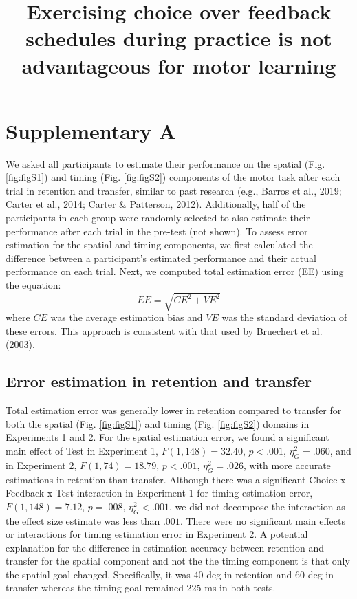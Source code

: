\documentclass[
  doc, donotrepeattitle,floatsintext]{apa7}
\title{Exercising choice over feedback schedules during practice is not advantageous for motor learning}
\author{\phantom{0}}
\date{}
\affiliation{\phantom{0}}
\begin{document}
\maketitle

\hypertarget{supplementary-a}{%
\section{Supplementary A}\label{supplementary-a}}

We asked all participants to estimate their performance on the spatial (Fig. \ref{fig:figS1}) and timing (Fig. \ref{fig:figS2}) components of the motor task after each trial in retention and transfer, similar to past research (e.g., Barros et al., 2019; Carter et al., 2014; Carter \& Patterson, 2012). Additionally, half of the participants in each group were randomly selected to also estimate their performance after each trial in the pre-test (not shown). To assess error estimation for the spatial and timing components, we first calculated the difference between a participant's estimated performance and their actual performance on each trial. Next, we computed total estimation error (EE) using the equation:
\begin{equation}
EE = \sqrt{CE^2 + VE^2}
\end{equation}
where \(CE\) was the average estimation bias and \(VE\) was the standard deviation of these errors. This approach is consistent with that used by Bruechert et al. (2003).

\hypertarget{error-estimation-in-retention-and-transfer}{%
\subsection{Error estimation in retention and transfer}\label{error-estimation-in-retention-and-transfer}}

Total estimation error was generally lower in retention compared to transfer for both the spatial (Fig. \ref{fig:figS1}) and timing (Fig. \ref{fig:figS2}) domains in Experiments 1 and 2. For the spatial estimation error, we found a significant main effect of Test in Experiment 1, \(F(1,148) = 32.40\), \(p < .001\), \(\eta_{G}^2 = .060\), and in Experiment 2, \(F(1,74) = 18.79\), \(p < .001\), \(\eta_{G}^2 = .026\), with more accurate estimations in retention than transfer. Although there was a significant Choice x Feedback x Test interaction in Experiment 1 for timing estimation error, \(F(1,148) = 7.12\), \(p = .008\), \(\eta_{G}^2 < .001\), we did not decompose the interaction as the effect size estimate was less than \(.001\). There were no significant main effects or interactions for timing estimation error in Experiment 2. A potential explanation for the difference in estimation accuracy between retention and transfer for the spatial component and not the the timing component is that only the spatial goal changed. Specifically, it was 40 deg in retention and 60 deg in transfer whereas the timing goal remained 225 ms in both tests.
\end{document}
